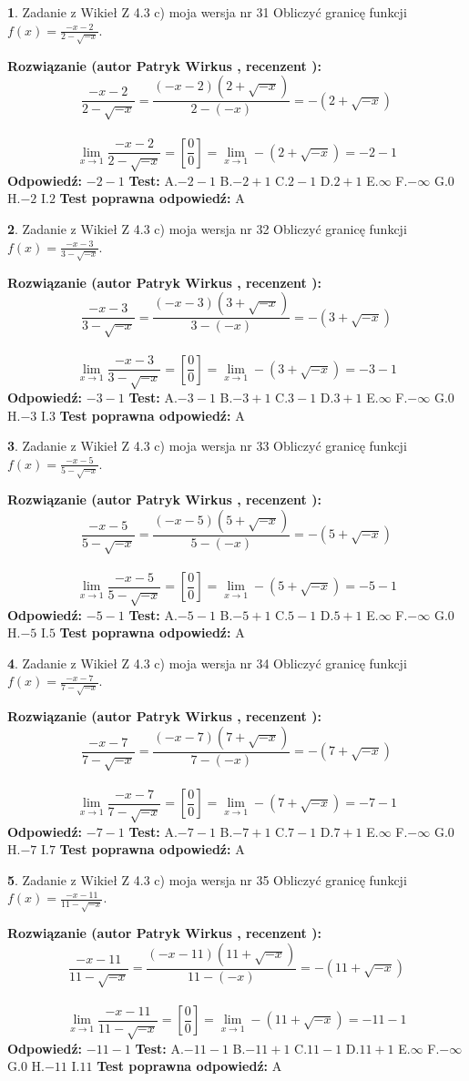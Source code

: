 \documentclass[12pt, a4paper]{article}
\theoremstyle{definition} %
\newtheorem{zad}{}
\newcommand{\zadStart}[1]{\begin{zad}#1\newline}
\newcommand{\zadStop}{\end{zad}}
\newcommand{\rozwStart}[2]{\noindent \textbf{Rozwiązanie (autor #1 , recenzent #2): }\newline}
\newcommand{\rozwStop}{\newline}
\newcommand{\odpStart}{\noindent \textbf{Odpowiedź:}\newline}
\newcommand{\odpStop}{\newline}
\newcommand{\testStart}{\noindent \textbf{Test:}\newline}
\newcommand{\testStop}{\newline}
\newcommand{\kluczStart}{\noindent \textbf{Test poprawna odpowiedź:}\newline}
\newcommand{\kluczStop}{\newline}
\begin{document}
\zadStart{Zadanie z Wikieł Z 4.3 c) moja wersja nr 31}
Obliczyć granicę funkcji $f(x)=\frac{-x-2}{2-\sqrt{-x}}$.
\zadStop
\rozwStart{Patryk Wirkus}{}
$$\frac{-x-2}{2-\sqrt{-x}}=\frac{(-x-2)(2+\sqrt{-x})}{2-(-x)}=-(2+\sqrt{-x})$$
\\
$$\lim\limits_{x\to1}\frac{-x-2}{2-\sqrt{-x}}=[\frac{0}{0}]=\lim\limits_{x\to1}-(2+\sqrt{-x}) =-2-1$$
\rozwStop
\odpStart
$-2-1$
\odpStop
\testStart
A.$-2-1$
B.$-2+1$
C.$2-1$
D.$2+1$
E.$\infty$
F.$-\infty$
G.$0$
H.$-2$
I.$2$
\testStop
\kluczStart
A
\kluczStop



\zadStart{Zadanie z Wikieł Z 4.3 c) moja wersja nr 32}
Obliczyć granicę funkcji $f(x)=\frac{-x-3}{3-\sqrt{-x}}$.
\zadStop
\rozwStart{Patryk Wirkus}{}
$$\frac{-x-3}{3-\sqrt{-x}}=\frac{(-x-3)(3+\sqrt{-x})}{3-(-x)}=-(3+\sqrt{-x})$$
\\
$$\lim\limits_{x\to1}\frac{-x-3}{3-\sqrt{-x}}=[\frac{0}{0}]=\lim\limits_{x\to1}-(3+\sqrt{-x}) =-3-1$$
\rozwStop
\odpStart
$-3-1$
\odpStop
\testStart
A.$-3-1$
B.$-3+1$
C.$3-1$
D.$3+1$
E.$\infty$
F.$-\infty$
G.$0$
H.$-3$
I.$3$
\testStop
\kluczStart
A
\kluczStop



\zadStart{Zadanie z Wikieł Z 4.3 c) moja wersja nr 33}
Obliczyć granicę funkcji $f(x)=\frac{-x-5}{5-\sqrt{-x}}$.
\zadStop
\rozwStart{Patryk Wirkus}{}
$$\frac{-x-5}{5-\sqrt{-x}}=\frac{(-x-5)(5+\sqrt{-x})}{5-(-x)}=-(5+\sqrt{-x})$$
\\
$$\lim\limits_{x\to1}\frac{-x-5}{5-\sqrt{-x}}=[\frac{0}{0}]=\lim\limits_{x\to1}-(5+\sqrt{-x}) =-5-1$$
\rozwStop
\odpStart
$-5-1$
\odpStop
\testStart
A.$-5-1$
B.$-5+1$
C.$5-1$
D.$5+1$
E.$\infty$
F.$-\infty$
G.$0$
H.$-5$
I.$5$
\testStop
\kluczStart
A
\kluczStop



\zadStart{Zadanie z Wikieł Z 4.3 c) moja wersja nr 34}
Obliczyć granicę funkcji $f(x)=\frac{-x-7}{7-\sqrt{-x}}$.
\zadStop
\rozwStart{Patryk Wirkus}{}
$$\frac{-x-7}{7-\sqrt{-x}}=\frac{(-x-7)(7+\sqrt{-x})}{7-(-x)}=-(7+\sqrt{-x})$$
\\
$$\lim\limits_{x\to1}\frac{-x-7}{7-\sqrt{-x}}=[\frac{0}{0}]=\lim\limits_{x\to1}-(7+\sqrt{-x}) =-7-1$$
\rozwStop
\odpStart
$-7-1$
\odpStop
\testStart
A.$-7-1$
B.$-7+1$
C.$7-1$
D.$7+1$
E.$\infty$
F.$-\infty$
G.$0$
H.$-7$
I.$7$
\testStop
\kluczStart
A
\kluczStop



\zadStart{Zadanie z Wikieł Z 4.3 c) moja wersja nr 35}
Obliczyć granicę funkcji $f(x)=\frac{-x-11}{11-\sqrt{-x}}$.
\zadStop
\rozwStart{Patryk Wirkus}{}
$$\frac{-x-11}{11-\sqrt{-x}}=\frac{(-x-11)(11+\sqrt{-x})}{11-(-x)}=-(11+\sqrt{-x})$$
\\
$$\lim\limits_{x\to1}\frac{-x-11}{11-\sqrt{-x}}=[\frac{0}{0}]=\lim\limits_{x\to1}-(11+\sqrt{-x}) =-11-1$$
\rozwStop
\odpStart
$-11-1$
\odpStop
\testStart
A.$-11-1$
B.$-11+1$
C.$11-1$
D.$11+1$
E.$\infty$
F.$-\infty$
G.$0$
H.$-11$
I.$11$
\testStop
\kluczStart
A
\kluczStop
\end{document}
